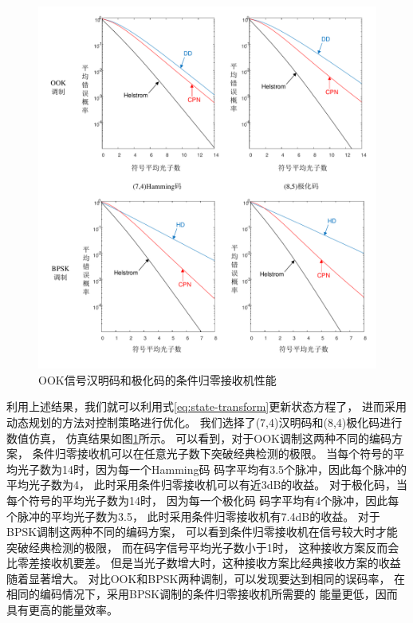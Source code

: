 \begin{figure} %
\centering
  \includegraphics[width=\textwidth]{figures/chap4/OOK-Code-error}
  \caption{OOK信号汉明码和极化码的条件归零接收机性能}
  \label{fig:OOK-Code-error}
\end{figure}


利用上述结果，我们就可以利用式\ref{eq:state-transform}更新状态方程了，
进而采用动态规划的方法对控制策略进行优化。
我们选择了(7,4)汉明码和(8,4)极化码进行数值仿真，
仿真结果如图\ref{fig:OOK-Code-error}所示。
可以看到，对于OOK调制这两种不同的编码方案，
条件归零接收机可以在任意光子数下突破经典检测的极限。
当每个符号的平均光子数为14时，因为每一个Hamming码
码字平均有3.5个脉冲，因此每个脉冲的平均光子数为4，
此时采用条件归零接收机可以有近3dB的收益。
对于极化码，当每个符号的平均光子数为14时，
因为每一个极化码
码字平均有4个脉冲，因此每个脉冲的平均光子数为3.5，
此时采用条件归零接收机有7.4dB的收益。
对于BPSK调制这两种不同的编码方案，
可以看到条件归零接收机在信号较大时才能突破经典检测的极限，
而在码字信号平均光子数小于1时，
这种接收方案反而会比零差接收机要差。
但是当光子数增大时，这种接收方案比经典接收方案的收益
随着显著增大。
对比OOK和BPSK两种调制，可以发现要达到相同的误码率，
在相同的编码情况下，采用BPSK调制的条件归零接收机所需要的
能量更低，因而具有更高的能量效率。


